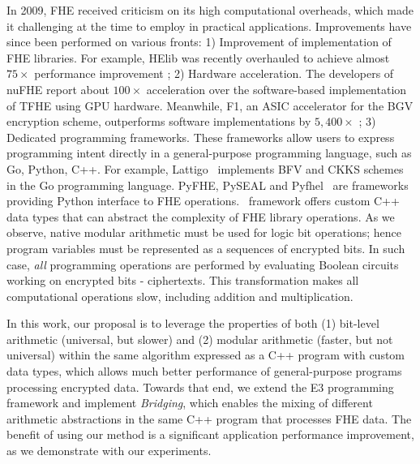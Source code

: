 In 2009, FHE received criticism on its high computational overheads, which made it challenging at the time to employ in practical applications. Improvements have since been performed on various fronts: 1) Improvement of implementation of FHE libraries. For example, HElib was recently overhauled to achieve almost $75 \times$ performance improvement \cite{cryptoeprint:2018:244}; 2) Hardware acceleration. The developers of nuFHE \cite{nuFHE} report about $100 \times$ acceleration over the software-based implementation of TFHE using GPU hardware. Meanwhile, F1, an ASIC accelerator for the BGV encryption scheme, outperforms software implementations by $5,400 \times$ \cite{f1}; 3) Dedicated programming frameworks. These frameworks allow users to express programming intent directly in a general-purpose programming language, such as Go, Python, C++.
For example, Lattigo~\cite{lattigop} implements  BFV and CKKS schemes in the Go programming language.
PyFHE, PySEAL and Pyfhel~\cite{pyfhel} are frameworks providing Python interface to FHE operations.
\eee\ framework \cite{e3eprint} offers custom C++ data types that can abstract the complexity of FHE library operations. As we observe, native modular arithmetic must be used for logic bit operations; hence program variables must be represented as a sequences of encrypted bits. In such case, \textit{all} programming operations are performed by evaluating Boolean circuits working on encrypted bits - ciphertexts. This transformation makes all computational operations slow, including addition and multiplication.

In this work, our proposal is to leverage the properties of both (1) bit-level arithmetic (universal, but slower) and (2) modular arithmetic (faster, but not universal) within the same algorithm expressed as a C++ program with custom data types, which allows much better performance of general-purpose programs processing encrypted data. 
Towards that end, we extend the E3 programming framework \cite{e3eprint} and implement \emph{Bridging}, which enables the mixing of different arithmetic abstractions in the same C++ program that processes FHE data.
The benefit of using our method is a significant application performance improvement, as we demonstrate with our experiments.


